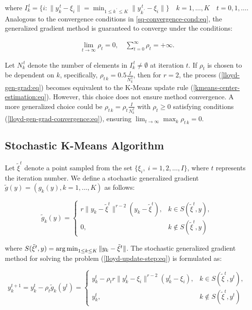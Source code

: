 \noindent where $I_k^{\,t} = \{i: \| y_k^{\,t} - \xi_i \| = \min_{1 \leq  k^{\,\prime} \leq K} \| y_{k^{\,\prime}}^{\,t}-\xi_i \| \} \quad k = 1 , \ldots , K \quad t = 0, 1 , \ldots$. Analogous to the convergence conditions in \ref{sq-convergence-cond:eq}, the generalized gradient method is guaranteed to converge under the conditions:

\begin{eqnarray}
    \label{lloyd-gen-grad-convergence:eq}
    \lim_{t\rightarrow\infty}\rho_t=0,\quad\sum_{t=0}^\infty\rho_t=+\infty.
\end{eqnarray}

Let $N_k^{\,t}$ denote the number of elements in $I_k^{\,t} \neq \emptyset$ at iteration $t$. If $\rho_t$ is chosen to be dependent on $k$, specifically, $\rho_{t\,k} = 0.5 \frac{I}{N_k^{\,t}}$, then for $r=2$, the process (\ref{lloyd-gen-grad:eq}) becomes equivalent to the K-Means update rule (\ref{kmeans-center-estimation:eq}). However, this choice does not ensure method convergence. A more generalized choice could be $\rho_{t\,k} = \rho_t \frac{I}{N_k^{\,t}}$ with $\rho_t \geq 0$ satisfying conditions (\ref{lloyd-gen-grad-convergence:eq}), ensuring $\lim_{t \to \infty} \max_k \rho_{t\,k} = 0$.

\subsection{Stochastic K-Means Algorithm}

Let $\tilde{\xi}^t$ denote a point sampled from the set $\{\xi_i,\;i=1,2,\ldots,I\}$, where $t$ represents the iteration number. We define a stochastic generalized gradient $\tilde{g}(y) = (g_k(y), k = 1, ..., K)$ as follows:

\begin{equation}
    \label{eq:stoch-lloyd-grad-component}
    \tilde{g}_k(y) = \begin{cases}
        r\|y_{k} - \tilde{\xi}^t\|^{r-2} (y_{k} - \tilde{\xi}^t), & k \in S(\tilde{\xi}^t,y),\\
        0, & k \notin S(\tilde{\xi}^t,y)
    \end{cases}
\end{equation}

\noindent where $S(\tilde{\xi}^t,y) = \operatorname*{arg\,min}_{1 \leq k \leq K} \| y_k - \tilde{\xi}^t \|$. The stochastic generalized gradient method for solving the problem (\ref{lloyd-update-step:eq}) is formulated as:

\begin{equation}
    \label{eq:stoch-lloyd-gen-grad}
    y_k^{t+1} = y_k^t - \rho_t \tilde{g}_k(y^t) = \begin{cases}
        y_k^t - \rho_t r\|y_k^t - \xi_i\|^{r-2}(y_k^t - \xi_i), & k \in S(\tilde{\xi}^t,y^t), \\
        y_k^t, & k \notin S(\tilde{\xi}^t,y^t)
    \end{cases}
\end{equation}

